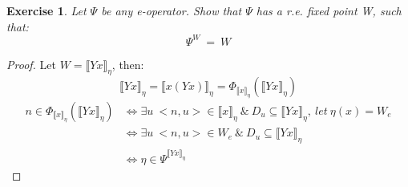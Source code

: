 \documentclass{article}
\newtheorem{exercise}{Exercise}[section]
\begin{document}
	\begin{exercise}
		Let $\Psi$ be any e-operator. Show that $\Psi$ has a 
		r.e. fixed point W, such that:
			\begin{equation}
				\Psi^W\:=\:W
			\end{equation}
	\end{exercise}
	\begin{proof}
		Let $W=\llbracket Yx \rrbracket_{\eta}$, then:
		\begin{equation}
			\llbracket Yx \rrbracket_{\eta} =
				\llbracket x(Yx) \rrbracket_{\eta} =
				\Phi_
					{\llbracket x \rrbracket_{\eta}} 
					(\llbracket Yx \rrbracket_{\eta})
		\end{equation}
		\begin{equation*}
		\begin{split}
			n \in \Phi_
					{\llbracket x \rrbracket_{\eta}} 
					(\llbracket Yx \rrbracket_{\eta})
				&\iff \exists u \: <n, u> \in 
				\llbracket x \rrbracket_{\eta} 
					\:\&\: D_u \subseteq \llbracket Yx \rrbracket_{\eta}
					,\:let\:\eta(x) = W_e\\
				&\iff \exists u \: <n, u> \in W_e
					\:\&\: D_u \subseteq \llbracket Yx \rrbracket_{\eta}\\
				&\iff \eta \in \Psi^{\llbracket Yx \rrbracket_{\eta}}
		\end{split}
		\end{equation*}
	\end{proof}
\end{document}
